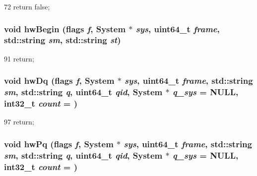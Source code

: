 \begin{DoxyCode}
72 { return false; }
\end{DoxyCode}
\hypertarget{classCPA_adaf891d4f8327c0311472739f4a2235b}{
\subsubsection[{hwBegin}]{\setlength{\rightskip}{0pt plus 5cm}void hwBegin ({\bf flags} {\em f}, \/  {\bf System} $\ast$ {\em sys}, \/  uint64\_\-t {\em frame}, \/  std::string {\em sm}, \/  std::string {\em st})}}
\label{classCPA_adaf891d4f8327c0311472739f4a2235b}



\begin{DoxyCode}
91                                                                 { return; }
\end{DoxyCode}
\hypertarget{classCPA_ac6ac43bd87dec93efd50230427086a92}{
\subsubsection[{hwDq}]{\setlength{\rightskip}{0pt plus 5cm}void hwDq ({\bf flags} {\em f}, \/  {\bf System} $\ast$ {\em sys}, \/  uint64\_\-t {\em frame}, \/  std::string {\em sm}, \/  std::string {\em q}, \/  uint64\_\-t {\em qid}, \/  {\bf System} $\ast$ {\em q\_\-sys} = {\ttfamily NULL}, \/  int32\_\-t {\em count} = {})}}
\label{classCPA_ac6ac43bd87dec93efd50230427086a92}



\begin{DoxyCode}
97                                                                   { return; }
\end{DoxyCode}
\hypertarget{classCPA_af8e1db0d850fba66449e84c9387c2fca}{
\subsubsection[{hwPq}]{\setlength{\rightskip}{0pt plus 5cm}void hwPq ({\bf flags} {\em f}, \/  {\bf System} $\ast$ {\em sys}, \/  uint64\_\-t {\em frame}, \/  std::string {\em sm}, \/  std::string {\em q}, \/  uint64\_\-t {\em qid}, \/  {\bf System} $\ast$ {\em q\_\-sys} = {\ttfamily NULL}, \/  int32\_\-t {\em count} = {})}}
\label{classCPA_af8e1db0d850fba66449e84c9387c2fca}



